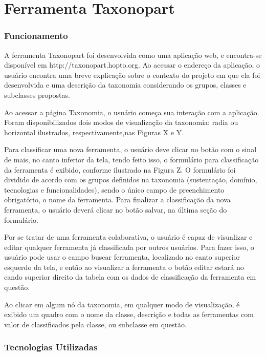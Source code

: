 \chapter[Ferramenta]{Ferramenta Taxonopart}
\label{cap:cap3}



\subsection{Funcionamento}
\label{sec:funcionamento}
A ferramenta Taxonopart foi desenvolvida como uma aplicação web, e encontra-se disponível em http://taxonopart.hopto.org.
Ao acessar o endereço da aplicação, o usuário encontra uma breve explicação sobre o contexto do projeto em que ela foi desenvolvida e uma descrição da taxonomia considerando os grupos, classes e subclasses propostas.

\par
Ao acessar a página Taxonomia, o usuário começa sua interação com a aplicação. Foram disponibilizados dois modos de visualização da taxonomia: radia ou horizontal ilustrados, respectivamente,nas Figuras X e Y.

Para classificar uma nova ferramenta, o usuário deve clicar no botão com o  sinal de mais, no canto inferior da tela, tendo feito isso,
o formulário para classificação da ferramenta é exibido, conforme ilustrado na Figura Z. O formulário foi dividido de acordo com os grupos definidos na taxonomia (sustentação, domínio, tecnologias e funcionalidades), sendo o único campo de preenchimento
obrigatório, o nome da ferramenta. Para finalizar a classificação da nova ferramenta, o usuário deverá clicar no botão salvar, na última seção do formulário. 

\par
Por se tratar de uma ferramenta colaborativa, o usuário é capaz de visualizar e editar qualquer ferramenta já classificada por outros usuários. 
Para fazer isso, o usuário pode usar o campo buscar ferramenta, localizado no canto superior esquerdo da tela, e então ao visualizar a ferramenta o botão editar estará 
no cando superior direito da tabela com os dados de classificação da ferramenta em questão.

\par
Ao clicar em algum nó da taxonomia, em qualquer modo de visualização, é exibido um quadro com o nome da classe, descrição e todas as ferramentas
com valor de classificados pela classe, ou subclasse em questão.

\subsection{Tecnologias Utilizadas}
\label{subsec:tecnologias}


